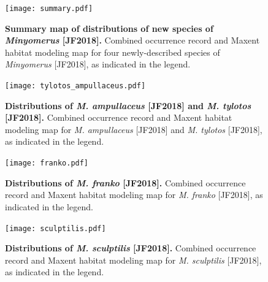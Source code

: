 \documentclass[fleqn,10pt,lineno]{wlpeerj} %
\begin{document}
\begin{figure}[h]
	\centering
	\texttt{[image: summary.pdf]}
	\caption{\textbf{Summary map of distributions of new species of \textit{Minyomerus} [JF2018].} Combined occurrence record and Maxent habitat modeling map for four newly-described species of \textit{Minyomerus} [JF2018], as indicated in the legend.}
	\label{fig:map_summary}
\end{figure}

\begin{figure}[h]
	\centering
	\texttt{[image: tylotos\_ampullaceus.pdf]}
	\caption{\textbf{Distributions of \textit{M. ampullaceus} [JF2018] and \textit{M. tylotos} [JF2018].} Combined occurrence record and Maxent habitat modeling map for \textit{M. ampullaceus} [JF2018] and \textit{M. tylotos} [JF2018], as indicated in the legend.}
	\label{fig:map_amptyl}
\end{figure}

\begin{figure}[h]
	\centering
	\texttt{[image: franko.pdf]}
	\caption{\textbf{Distributions of \textit{M. franko} [JF2018].} Combined occurrence record and Maxent habitat modeling map for \textit{M. franko} [JF2018], as indicated in the legend.}
	\label{fig:map_franko}
\end{figure}

\begin{figure}[h]
	\centering
	\begin{sideways}
		\texttt{[image: sculptilis.pdf]}
		\end{sideways}
	\caption{\textbf{Distributions of \textit{M. sculptilis} [JF2018].} Combined occurrence record and Maxent habitat modeling map for \textit{M. sculptilis} [JF2018], as indicated in the legend.}
	\label{fig:map_sculptilis}
\end{figure}
\end{document}
